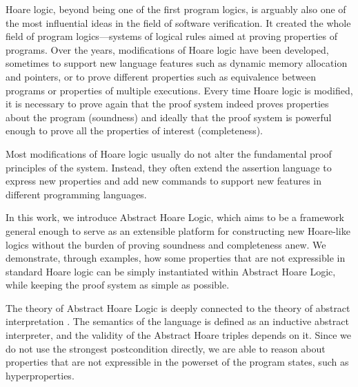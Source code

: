 \documentclass[
  10pt,       %
  twoside,    %
  a4paper,    %
  english,    %
  tikz,       %
  openright,  %
]{book}
\begin{document}
Hoare logic, beyond being one of the first program logics, is arguably also one
of the most influential ideas in the field of software verification. It created
the whole field of program logics—systems of logical rules aimed at proving
properties of programs. Over the years, modifications of Hoare logic have been
developed, sometimes to support new language features such as dynamic memory
allocation and pointers, or to prove different properties such as equivalence
between programs or properties of multiple executions. Every time Hoare logic
is modified, it is necessary to prove again that the proof system indeed proves
properties about the program (soundness) and ideally that the proof system is
powerful enough to prove all the properties of interest (completeness).

Most modifications of Hoare logic usually do not alter the fundamental proof
principles of the system. Instead, they often extend the assertion language to
express new properties and add new commands to support new features in
different programming languages.

In this work, we introduce Abstract Hoare Logic, which aims to be a framework
general enough to serve as an extensible platform for constructing new
Hoare-like logics without the burden of proving soundness and completeness
anew. We demonstrate, through examples, how some properties that are not
expressible in standard Hoare logic can be simply instantiated within Abstract
Hoare Logic, while keeping the proof system as simple as possible.

The theory of Abstract Hoare Logic is deeply connected to the theory of
abstract interpretation \cite{Cousot77}. The semantics of the language is
defined as an inductive abstract interpreter, and the validity of the Abstract
Hoare triples depends on it. Since we do not use the strongest postcondition
directly, we are able to reason about properties that are not expressible in
the powerset of the program states, such as hyperproperties.
\end{document}
